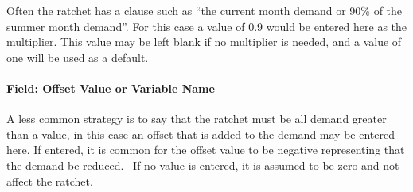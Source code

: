 Often the ratchet has a clause such as ``the current month demand or 90\% of the summer month demand''. For this case a value of 0.9 would be entered here as the multiplier. This value may be left blank if no multiplier is needed, and a value of one will be used as a default.

\paragraph{Field: Offset Value or Variable Name}\label{field-offset-value-or-variable-name}

A less common strategy is to say that the ratchet must be all demand greater than a value, in this case an offset that is added to the demand may be entered here. If entered, it is common for the offset value to be negative representing that the demand be reduced.~ If no value is entered, it is assumed to be zero and not affect the ratchet.
